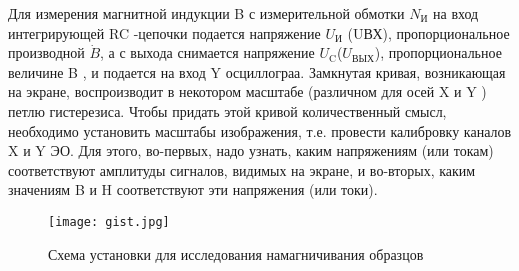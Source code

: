 Для измерения магнитной индукции B с измерительной обмотки $N_\text{И}$ на вход интегрирующей RC -цепочки подается напряжение $U_\text{И}$ (UВХ), пропорциональное производной $\dot{B}$, а с выхода снимается напряжение $U_\text{C}$($U_\text{ВЫХ}$), пропорциональное
величине B , и подается на вход Y осциллограа.
Замкнутая кривая, возникающая на экране, воспроизводит в некотором масштабе (различном для осей X и Y ) петлю гистерезиса. Чтобы придать этой кривой количественный смысл, необходимо установить масштабы изображения, т.е. провести калибровку каналов X и Y ЭО. Для этого, во-первых, надо узнать, каким напряжениям (или токам) соответствуют амплитуды сигналов, видимых на экране, и во-вторых,  каким значениям B и H соответствуют эти напряжения
(или токи).

\begin{figure}[h!]
    \centering
    \texttt{[image: gist.jpg]}
    \caption{Схема установки для исследования намагничивания образцов}
    \label{fig:Holl2}
\end{figure}
